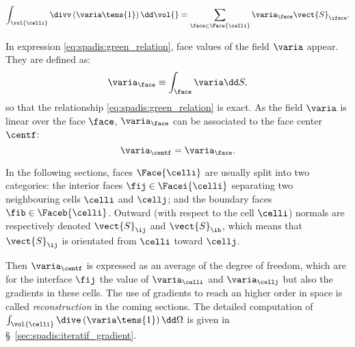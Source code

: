 \begin{equation}\label{eq:spadis:green_relation}
\int_{\vol{\celli}} \divv \left( \varia \tens{1}\right) \dd \vol{} =  \sum\limits_{\face \in \Face{\celli}} \varia_{\face}\vect{S}_{\iface}.
\end{equation}

In expression \eqref{eq:spadis:green_relation}, face values of the field $\varia$ appear. They are defined as:
\begin{equation}\label{eq:spadis:variaf_def}
\varia_\face \equiv \int_{\face} \varia \dd S,
\end{equation}
%
so that the relationship \eqref{eq:spadis:green_relation} is exact. As the field $\varia$ is linear over the face $\face$,  
$\varia_\face$ can be associated to the face center $\centf$:
\begin{equation}\label{eq:spadis:variaf_id}
\varia_\centf = \varia_\face.
\end{equation}

In the following sections, faces $\Face{\celli}$ are usually split into two categories: the interior faces $\fij \in \Facei{\celli}$ separating
two neighbouring cells $\celli$ and $\cellj$; and the boundary faces $\fib \in \Faceb{\celli}$. 
Outward (with respect to the cell $\celli$) normals are respectively denoted  $\vect{S}_\ij$ and $\vect{S}_\ib$, 
which means that $\vect{S}_\ij$ is orientated from $\celli$ toward $\cellj$. 

Then $\varia_{\centf}$ is expressed as an average of the degree of freedom, which are for the interface $\fij$ the value of $\varia_\celli$ 
and $\varia_\cellj$ but also the gradients in these cells. The use of gradients to reach an higher order in space is called \emph{reconstruction} 
in the coming sections. The detailed computation of $\int_{\vol{\celli}} \dive \left( \varia \tens{1}\right) \dd \Omega $ is given in
 \S~\ref{sec:spadis:iteratif_gradient}. 
%
 
